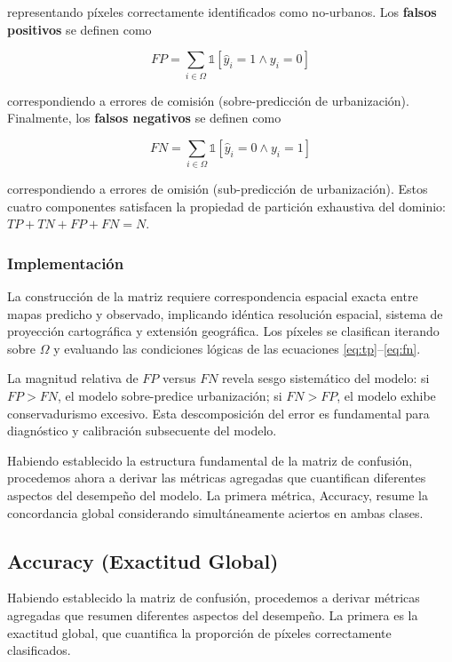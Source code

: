 representando píxeles correctamente identificados como no-urbanos. Los \textbf{falsos positivos} se definen como

\begin{equation}
FP = \sum_{i \in \Omega} \mathbb{1}[\hat{y}_i = 1 \land y_i = 0]
\label{eq:fp}
\end{equation}

correspondiendo a errores de comisión (sobre-predicción de urbanización). Finalmente, los \textbf{falsos negativos} se definen como

\begin{equation}
FN = \sum_{i \in \Omega} \mathbb{1}[\hat{y}_i = 0 \land y_i = 1]
\label{eq:fn}
\end{equation}

correspondiendo a errores de omisión (sub-predicción de urbanización). Estos cuatro componentes satisfacen la propiedad de partición exhaustiva del dominio: $TP + TN + FP + FN = N$.

\subsubsection{Implementación}

La construcción de la matriz requiere correspondencia espacial exacta entre mapas predicho y observado, implicando idéntica resolución espacial, sistema de proyección cartográfica y extensión geográfica. Los píxeles se clasifican iterando sobre $\Omega$ y evaluando las condiciones lógicas de las ecuaciones \eqref{eq:tp}--\eqref{eq:fn}.

La magnitud relativa de $FP$ versus $FN$ revela sesgo sistemático del modelo: si $FP > FN$, el modelo sobre-predice urbanización; si $FN > FP$, el modelo exhibe conservadurismo excesivo. Esta descomposición del error es fundamental para diagnóstico y calibración subsecuente del modelo.

Habiendo establecido la estructura fundamental de la matriz de confusión, procedemos ahora a derivar las métricas agregadas que cuantifican diferentes aspectos del desempeño del modelo. La primera métrica, Accuracy, resume la concordancia global considerando simultáneamente aciertos en ambas clases.

\subsection{Accuracy (Exactitud Global)}

Habiendo establecido la matriz de confusión, procedemos a derivar métricas agregadas que resumen diferentes aspectos del desempeño. La primera es la exactitud global, que cuantifica la proporción de píxeles correctamente clasificados.

